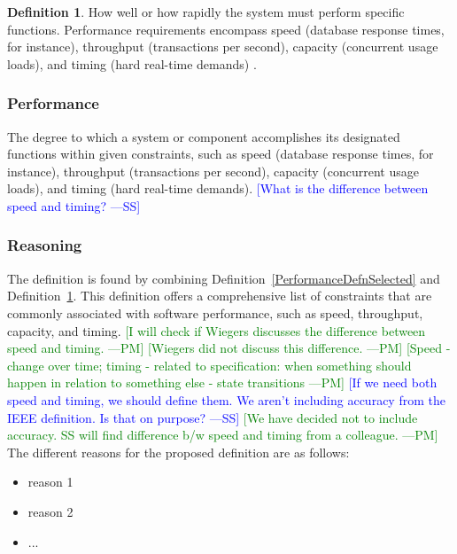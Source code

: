 \documentclass[letterpaper, cleveref]{lipics-v2019}
\newcommand{\authornote}[3]{\textcolor{#1}{[#3 ---#2]}}
\newcommand{\authornote}[3]{}
\newcommand{\wss}[1]{\authornote{blue}{SS}{#1}} %
\newcommand{\pmi}[1]{\authornote{green}{PM}{#1}} %
\theoremstyle{definition}
\newtheorem{defn}{Definition}
\begin{document}
\begin{defn} \label{PerformanceDefnSelected2} How well or how rapidly the system
	must perform specific functions. Performance requirements encompass speed
	(database response times, for instance), throughput (transactions per second),
	capacity (concurrent usage loads), and timing (hard real-time demands)
	\citep{wiegers2003softreq}.
\end{defn}

\begin{mybox}
\subsubsection*{Performance}
The degree to which a system or component accomplishes its designated functions
within given constraints, such as speed (database response times, for instance),
throughput (transactions per second), capacity (concurrent usage loads), and
timing (hard real-time demands).
\wss{What is the difference between speed and timing?}
\end{mybox}

\subsubsection*{Reasoning}

The definition is found by combining Definition~\ref{PerformanceDefnSelected}
and Definition~\ref{PerformanceDefnSelected2}.  This definition offers a
comprehensive list of constraints that are commonly associated with software
performance, such as speed, throughput, capacity, and timing. \pmi{I will check
if Wiegers discusses the difference between speed and timing.} \pmi{Wiegers did
not discuss this difference.}  \pmi{Speed - change over time; timing - related
to specification: when something should happen in relation to something else -
state transitions}  \wss{If we need both speed and timing, we should define
them.  We aren't including accuracy from the IEEE definition.  Is that on
purpose?}  \pmi{We have decided not to include accuracy. SS will find difference
b/w speed and timing from a colleague.}   The different reasons for the proposed
definition are as follows:

\begin{itemize}
  \item reason 1
  \item reason 2
  \item ...
\end{itemize}
\end{document}
